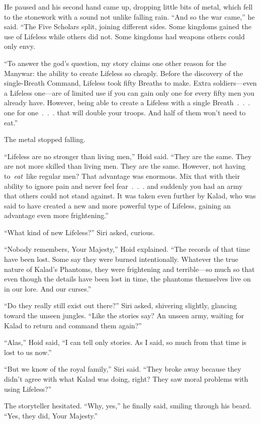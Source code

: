 He paused and his second hand came up, dropping little bits of metal, which fell to the stonework with a sound not unlike falling rain. “And so the war came,” he said. “The Five Scholars split, joining different sides. Some kingdoms gained the use of Lifeless while others did not. Some kingdoms had weapons others could only envy.

“To answer the god’s question, my story claims one other reason for the Manywar: the ability to create Lifeless so cheaply. Before the discovery of the single-Breath Command, Lifeless took fifty Breaths to make. Extra soldiers—even a Lifeless one—are of limited use if you can gain only one for every fifty men you already have. However, being able to create a Lifeless with a single Breath~.~.~. one for one~.~.~. that will double your troops. And half of them won’t need to eat.”

The metal stopped falling.

“Lifeless are no stronger than living men,” Hoid said. “They are the same. They are not more skilled than living men. They are the same. However, not having to~\textit{eat}~like regular men? That advantage was enormous. Mix that with their ability to ignore pain and never feel fear~.~.~. and suddenly you had an army that others could not stand against. It was taken even further by Kalad, who was said to have created a new and more powerful type of Lifeless, gaining an advantage even more frightening.”

“What kind of new Lifeless?” Siri asked, curious.

“Nobody remembers, Your Majesty,” Hoid explained. “The records of that time have been lost. Some say they were burned intentionally. Whatever the true nature of Kalad’s Phantoms, they were frightening and terrible—so much so that even though the details have been lost in time, the phantoms themselves live on in our lore. And our curses.”

“Do they really still exist out there?” Siri asked, shivering slightly, glancing toward the unseen jungles. “Like the stories say? An unseen army, waiting for Kalad to return and command them again?”

“Alas,” Hoid said, “I can tell only stories. As I said, so much from that time is lost to us now.”

“But we know of the royal family,” Siri said. “They broke away because they didn’t agree with what Kalad was doing, right? They saw moral problems with using Lifeless?”

The storyteller hesitated. “Why, yes,” he finally said, smiling through his beard. “Yes, they did, Your Majesty.”

